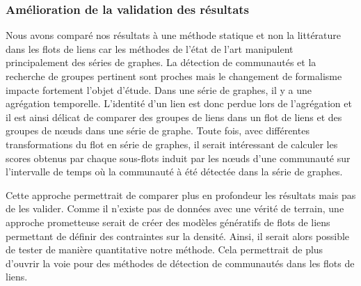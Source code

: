 \subsubsection{Amélioration de la validation des résultats}

Nous avons comparé nos résultats à une méthode statique et non la littérature dans les flots de liens car les méthodes de l'état de l'art manipulent principalement des séries de graphes.
La détection de communautés et la recherche de groupes pertinent sont proches mais le changement de formalisme impacte fortement l'objet d'étude.
Dans une série de graphes, il y a une agrégation temporelle.
L'identité d'un lien est donc perdue lors de l'agrégation et il est ainsi délicat de comparer des groupes de liens dans un flot de liens et des groupes de n\oe uds dans une série de graphe.
Toute fois, avec différentes transformations du flot en série de graphes, il serait intéressant de calculer les scores obtenus par chaque sous-flots induit par les n\oe uds d'une communauté sur l'intervalle de temps où la communauté à été détectée dans la série de graphes.


Cette approche permettrait de comparer plus en profondeur les résultats mais pas de les valider.
Comme il n'existe pas de données avec une vérité de terrain, une approche prometteuse serait de créer des modèles génératifs de flots de liens permettant de définir des contraintes sur la densité.
Ainsi, il serait alors possible de tester de manière quantitative notre méthode.
Cela permettrait de plus d'ouvrir la voie pour des méthodes de détection de communautés dans les flots de liens.